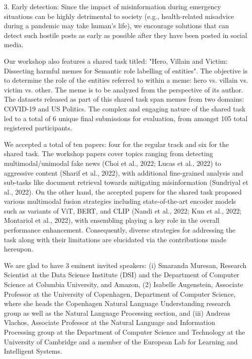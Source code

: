 \documentclass[11pt,oneside]{book}
\begin{document}
3. Early detection: ​Since the impact of misinformation during emergency situations can be highly detrimental to society (e.g., health-related misadvice during a pandemic may take human's life), we encourage solutions that can detect such hostile posts as early as possible after they have been posted in social media.

Our workshop also features a shared task titled: "Hero, Villain and Victim: Dissecting harmful memes for Semantic role labelling of entities". The objective is to determine the role of the entities referred to within a meme: hero vs. villain vs. victim vs. other. The meme is to be analyzed from the perspective of its author. The datasets released as part of this shared task span memes from two domains: COVID-19 and US Politics. The complex and engaging nature of the shared task led to a total of 6 unique final submissions for evaluation, from amongst 105 total registered participants.

We accepted a total of ten papers: four for the regular track and six for the shared task. The workshop papers cover topics ranging from detecting multimodal/unimodal fake news (Choi et al., 2022; Lucas et al., 2022) to aggressive content (Sharif et al., 2022), with additional fine-grained analysis and sub-tasks like document retrieval towards mitigating misinformation (Sundriyal et al., 2022). On the other hand, the accepted papers for the shared task proposed various multimodal fusion strategies including state-of-the-art encoder models such as variants of ViT, BERT, and CLIP (Nandi et al., 2022; Kun et al., 2022; Montariol et al., 2022), with ensembling playing a key role in the overall performance enhancement. Consequently, diverse strategies for addressing the task along with their limitations are elucidated via the contributions made hereupon. 

We are glad to have 3 eminent invited speakers: (i) Smaranda Muresan, Research Scientist at the Data Science Institute (DSI) and the Department of Computer Science at Columbia University, and Amazon, (2) Isabelle Augenstein, Associate Professor at the University of Copenhagen, Department of Computer Science, where she heads the Copenhagen Natural Language Understanding research group as well as the Natural Language Processing section, and (iii) Andreas Vlachos, Associate Professor at the Natural Language and Information Processing group at the Department of Computer Science and Technology at the University of Cambridge and a member of the European Lab for Learning and Intelligent Systems.
\end{document}
